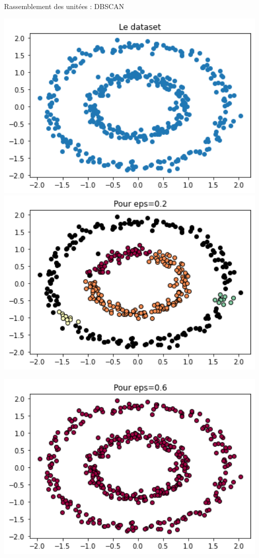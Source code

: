 \documentclass[french]{beamer}
\begin{document}
\begin{frame}{Rassemblement des unitées : DBSCAN}
	\begin{minipage}{0.5\textwidth}
		\centering
		\includegraphics[width=0.99\textwidth]{circles.png}
		\includegraphics[width=0.99\textwidth]{petit_eps.png}
	\end{minipage}\hfill
	\begin{minipage}{0.5\textwidth}
		\centering
		\includegraphics[width=0.99\textwidth]{grand_eps.png}

\end{minipage}
\end{frame}
\end{document}
